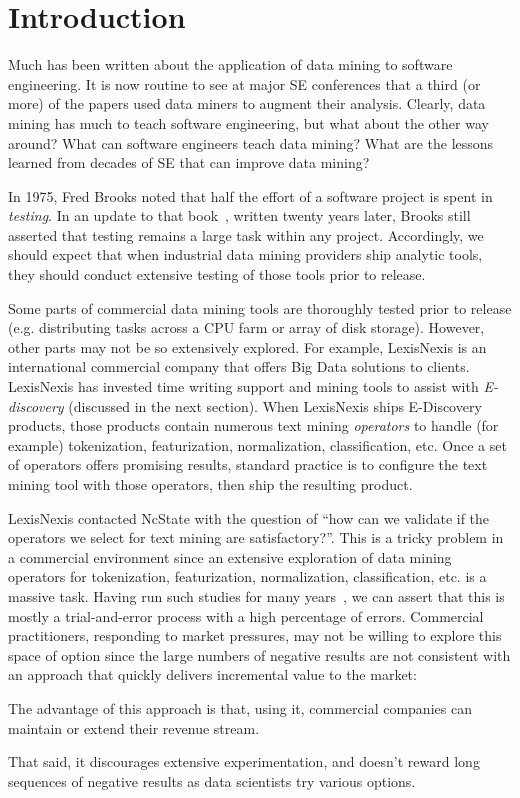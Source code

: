 \documentclass{sig-alternate-05-2015}
\newcommand{\bi}{\begin{itemize*}}
\newcommand{\ei}{\end{itemize*}}
\theoremstyle{break}
\begin{document}
\section{Introduction}


Much has been written about the application of data mining
to software engineering. It is now routine to see at major SE
conferences that a third (or more) of the papers used data miners
to augment their analysis.
Clearly, data mining has much to teach software engineering, but what about the other way around? What can software engineers teach
data mining? What are the lessons learned from decades of SE that
can improve data mining?


In 1975, Fred Brooks noted that half the effort 
of a software project is spent in {\em testing}. In an update
to that book~\cite{Brooks95}, written twenty years later, Brooks still
asserted that testing remains a large task within any project.
Accordingly, we should expect that when industrial data mining
providers ship analytic tools, they should conduct extensive
testing of those tools prior to release.


Some parts of commercial data mining tools are thoroughly tested prior to
release (e.g. distributing tasks across
a CPU farm or array of disk storage). However, other parts
may not be so extensively explored. For example, 
LexisNexis  is an international commercial company that offers
Big Data solutions to clients. LexisNexis has
invested time writing support and mining tools to assist with {\em E-discovery} (discussed
in the next section).  
When LexisNexis ships E-Discovery products, those products contain
numerous text mining {\em operators} to handle (for example)
tokenization, featurization, normalization, classification, etc. 
Once a set of operators offers promising results,
standard practice is to configure the text mining tool
with those operators, then ship the resulting product.

LexisNexis contacted NcState with the question of ``how can
we validate if the operators we select for text mining are 
satisfactory?''. This is a tricky problem in a commercial
environment since an extensive exploration of  data mining operators for
tokenization, featurization, normalization, classification, etc.
is a massive task. Having run such studies for many years~\cite{menzies2014sharing},
we can assert that this is mostly a trial-and-error process
with a high percentage of errors. Commercial practitioners, responding to market pressures, may not be willing to explore this  space of option
since the large numbers of negative results are not consistent
with an approach that quickly delivers incremental value to the market:
\bi
\item
The advantage
of this approach is that, using it,  commercial companies can maintain or extend their revenue stream.
\item
That said, it discourages extensive experimentation, and doesn't reward  long sequences of negative results as data scientists try various options.
\ei
\end{document}

